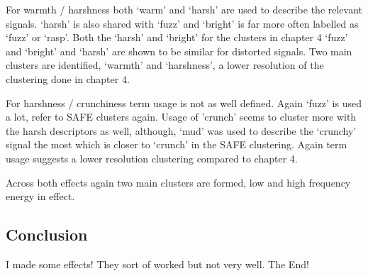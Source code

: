 			

			\note
			{
				For warmth / harshness both `warm' and `harsh' are used to describe the relevant signals.
				`harsh' is also shared with `fuzz' and `bright' is far more often labelled as `fuzz' or
				`rasp'. Both the `harsh' and `bright' for the clusters in chapter 4 `fuzz' and `bright' and
				`harsh' are shown to be similar for distorted signals. Two main clusters are identified,
				`warmth' and `harshness', a lower resolution of the clustering done in chapter 4.

				For harshness / crunchiness term usage is not as well defined. Again `fuzz' is used a lot,
				refer to SAFE clusters again. Usage of 'crunch' seems to cluster more with the harsh
				descriptors as well, although, `mud' was used to describe the `crunchy' signal the most
				which is closer to `crunch' in the SAFE clustering. Again term usage suggests a lower
				resolution clustering compared to chapter 4.

				Across both effects again two main clusters are formed, low and high frequency energy in
				effect.
			}

	\subsection{Conclusion}
	\label{sec:PerceptualExperiments-SemanticControl-Conclusion}
		\note
		{
			I made some effects! They sort of worked but not very well. The End!
		}
